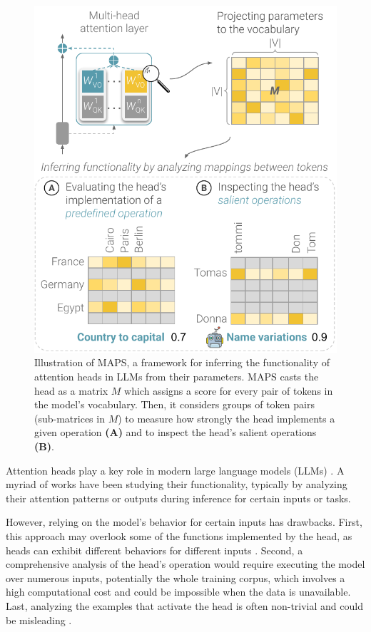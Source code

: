 \documentclass[11pt]{article}
\newcommand{\framework}{\textsc{MAPS}}
\begin{document}
\begin{figure}[t]
\setlength\belowcaptionskip{-10pt}
\centering
\includegraphics[scale=0.55]{figures/attn_func_v2.pdf}
\caption{Illustration of \framework{}, a framework for inferring the functionality of attention heads in LLMs from their parameters. \framework{} casts the head as a matrix $M$ which assigns a score for every pair of tokens in the model's vocabulary. Then, it considers groups of token pairs (sub-matrices in $M$) to measure how strongly the head implements a given operation \textbf{(A)} and to inspect the head's salient operations \textbf{(B)}.}
\label{fig:intro}
\end{figure}


Attention heads play a key role in modern large language models (LLMs) \citep{Vaswani2017AttentionIA, zhou2024role, olsson2022context}. 
A myriad of works \citep{zheng2024attention, ferrando2024primer} have been studying their functionality, typically by analyzing their attention patterns or outputs during inference for certain inputs or tasks.

However, relying on the model's behavior for certain inputs has drawbacks. First, this approach may overlook some of the functions implemented by the head, as heads can exhibit different behaviors for different inputs \citep{gould2024successor, merullo2024circuit, olsson2022context, kissane2024interpreting}. 
Second, a comprehensive analysis of the head's operation would require executing the model over numerous inputs, potentially the whole training corpus, which involves a high computational cost and could be impossible when the data is unavailable.
Last, analyzing the examples that activate the head is often non-trivial and could be misleading \citep{bolukbasi2021interpretability, gao2024scaling, kissane2024interpreting}. 
\end{document}
